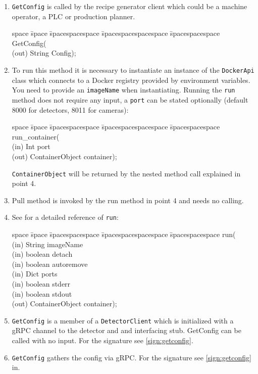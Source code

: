 \begin{enumerate}
    \item \texttt{GetConfig} is called by the recipe generator client which could be a machine operator, a PLC or production planner. \begin{tabbing}
            space \= space \= spacespacespace \= spacespacespacespace \= spacespacespace \kill
            \>  GetConfig(\\
            \>  \>  (out)	 \> 	String           \> Config); 
        \end{tabbing} \label{sign:getconfig}
        
    \item To run this method it is necessary to instantiate an instance of the \texttt{DockerApi} class which connects to a Docker registry provided by environment variables. You need to provide an \texttt{imageName} when instantiating. Running the \texttt{run} method does not require any input, a \texttt{port} can be stated optionally (default 8000 for detectors, 8011 for cameras): \begin{tabbing}
    space \= space \= spacespacespace \= spacespacespacespace \= spacespacespace \kill
    \>  run\_container(\\
    \>  \>  (in)	 \> 	Int          \> port\\
    \>  \>  (out)	 \> 	ContainerObject           \> container); 
    \end{tabbing}
    \texttt{ContainerObject} will be returned by the nested method call explained in point 4. \label{sign:runcontainer}
    \item Pull method is invoked by the run method in point 4 and needs no calling. \label{sign:pull}
    \item See \cite{LastvisitedMay4th2019DockerPython} for a detailed reference of \texttt{run}: 
    \begin{tabbing}
    space \= space \= spacespacespace \= spacespacespacespace \= spacespacespace \kill
    \>  run(\\
    \>  \>  (in)	 \> 	String          \> imageName\\
    \>  \>  (in)	 \> 	boolean          \> detach\\
    \>  \>  (in)	 \> 	boolean    \> autoremove\\
    \>  \>  (in)	 \> 	Dict   \> ports\\
    \>  \>  (in)	 \> 	boolean   \> stderr\\
    \>  \>  (in)	 \> 	boolean          \> stdout\\
    \>  \>  (out)	 \> 	ContainerObject           \> container); 
    \end{tabbing}\label{sign:run}
    \item \texttt{GetConfig} is a member of a \texttt{DetectorClient} which is initialized with a gRPC channel to the detector and and interfacing stub. GetConfig can be called with no input. For the signature see \ref{sign:getconfig}.
    \item \texttt{GetConfig} gathers the config via gRPC. For the signature see  \ref{sign:getconfig} in.
\end{enumerate}


